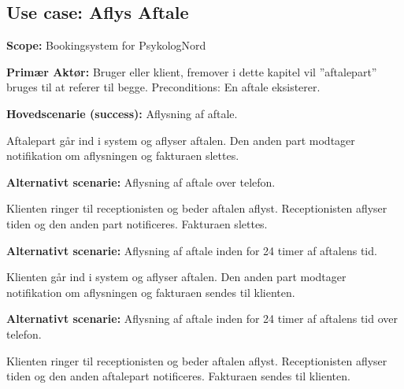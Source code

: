 \subsection{Use case: Aflys Aftale}
{\setlength{\parindent}{0cm}
\textbf{Scope:} Bookingsystem for PsykologNord

\textbf{Primær Aktør:} Bruger eller klient, fremover i dette kapitel vil ”aftalepart” bruges til at referer til begge.
Preconditions: En aftale eksisterer.

\textbf{Hovedscenarie (success):} Aflysning af aftale.

Aftalepart går ind i system og aflyser aftalen. Den anden part modtager notifikation om aflysningen og fakturaen slettes.

\textbf{Alternativt scenarie:} Aflysning af aftale over telefon.

Klienten ringer til receptionisten og beder aftalen aflyst. Receptionisten aflyser tiden og den anden part notificeres. Fakturaen slettes.

\textbf{Alternativt scenarie:} Aflysning af aftale inden for 24 timer af aftalens tid.

Klienten går ind i system og aflyser aftalen. Den anden part modtager notifikation om aflysningen og fakturaen sendes til klienten.

\textbf{Alternativt scenarie:} Aflysning af aftale inden for 24 timer af aftalens tid over telefon.

Klienten ringer til receptionisten og beder aftalen aflyst. Receptionisten aflyser tiden og den anden aftalepart notificeres. Fakturaen sendes til klienten.
}
